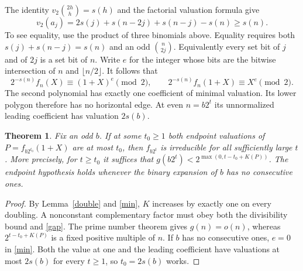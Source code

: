 \documentclass[11pt]{article}
\newtheorem{theorem}{Theorem}
\newcommand{\val}{v_2}
\begin{document}
The identity $\val\binom{2h}{h}=s(h)$ and the factorial valuation formula give
\[
 \val(a_j)=2s(j)+s(n-2j)+s(n-j)-s(n)\ge s(n).
\]
To see equality, use the product of three binomials above. Equality requires both $s(j)+s(n-j)=s(n)$ and an odd $\binom n{2j}$. Equivalently every set bit of $j$ and of $2j$ is a set bit of $n$. Write $e$ for the integer whose bits are the bitwise intersection of $n$ and $\lfloor n/2\rfloor$. It follows that
\begin{equation}
 2^{-s(n)}f_n(X)\equiv(1+X)^e\pmod2,\qquad
 2^{-s(n)}f_n(1+X)\equiv X^e\pmod2. \label{min}
\end{equation}
The second polynomial has exactly one coefficient of minimal valuation. Its lower polygon therefore has no horizontal edge. At even $n=b2^t$ its unnormalized leading coefficient has valuation $2s(b)$.

\begin{theorem}\label{rays}
Fix an odd $b$. If at some $t_0\ge1$ both endpoint valuations of $P=f_{b2^{t_0}}(1+X)$ are at most $t_0$, then $f_{b2^t}$ is irreducible for all sufficiently large $t$. More precisely, for $t\ge t_0$ it suffices that $g(b2^t)<2^{\max(0,t-t_0+K(P))}$. The endpoint hypothesis holds whenever the binary expansion of $b$ has no consecutive ones.
\end{theorem}
\begin{proof}
By Lemma~\ref{double} and \eqref{min}, $K$ increases by exactly one on every doubling. A nonconstant complementary factor must obey both the divisibility bound and \eqref{gap}. The prime number theorem gives $g(n)=o(n)$, whereas $2^{t-t_0+K(P)}$ is a fixed positive multiple of $n$. If $b$ has no consecutive ones, $e=0$ in \eqref{min}. Both the value at one and the leading coefficient have valuations at most $2s(b)$ for every $t\ge1$, so $t_0=2s(b)$ works.\end{proof}
\end{document}
